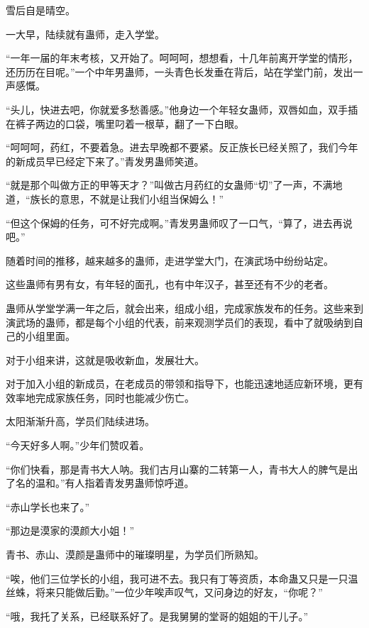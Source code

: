 
\begin{this_body}



雪后自是晴空。

一大早，陆续就有蛊师，走入学堂。

“一年一届的年末考核，又开始了。呵呵呵，想想看，十几年前离开学堂的情形，还历历在目呢。”一个中年男蛊师，一头青色长发垂在背后，站在学堂门前，发出一声感慨。

“头儿，快进去吧，你就爱多愁善感。”他身边一个年轻女蛊师，双唇如血，双手插在裤子两边的口袋，嘴里叼着一根草，翻了一下白眼。

“呵呵呵，药红，不要着急。进去早晚都不要紧。反正族长已经关照了，我们今年的新成员早已经定下来了。”青发男蛊师笑道。

“就是那个叫做方正的甲等天才？”叫做古月药红的女蛊师“切”了一声，不满地道，“族长的意思，不就是让我们小组当保姆么！”

“但这个保姆的任务，可不好完成啊。”青发男蛊师叹了一口气，“算了，进去再说吧。”

随着时间的推移，越来越多的蛊师，走进学堂大门，在演武场中纷纷站定。

这些蛊师有男有女，有年轻的面孔，也有中年汉子，甚至还有不少的老者。

蛊师从学堂学满一年之后，就会出来，组成小组，完成家族发布的任务。这些来到演武场的蛊师，都是每个小组的代表，前来观测学员们的表现，看中了就吸纳到自己的小组里面。

对于小组来讲，这就是吸收新血，发展壮大。

对于加入小组的新成员，在老成员的带领和指导下，也能迅速地适应新环境，更有效率地完成家族任务，同时也能减少伤亡。

太阳渐渐升高，学员们陆续进场。

“今天好多人啊。”少年们赞叹着。

“你们快看，那是青书大人呐。我们古月山寨的二转第一人，青书大人的脾气是出了名的温和。”有人指着青发男蛊师惊呼道。

“赤山学长也来了。”

“那边是漠家的漠颜大小姐！”

青书、赤山、漠颜是蛊师中的璀璨明星，为学员们所熟知。

“唉，他们三位学长的小组，我可进不去。我只有丁等资质，本命蛊又只是一只温丝蛛，将来只能做后勤。”一位少年唉声叹气，又问身边的好友，“你呢？”

“哦，我托了关系，已经联系好了。是我舅舅的堂哥的姐姐的干儿子。”


\end{this_body}
